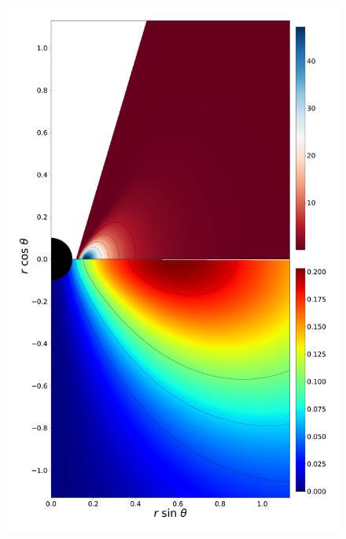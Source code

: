 \documentclass[twocolumn,aps,showpacs,showkeys,prd,superscriptaddress,byrevtex, amsmath]{revtex4-1}
\begin{document}
\begin{figure}
\includegraphics[scale=0.12]{figures/fig5_IV__10.pdf}
\hspace{-0.3cm}

\end{figure}
\end{document}

